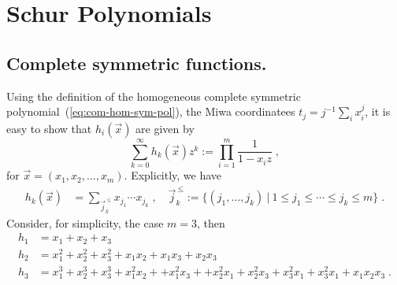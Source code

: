 \section{Schur Polynomials}


\subsection{Complete symmetric functions.} 

Using the definition of the homogeneous complete symmetric
polynomial~(\ref{eq:com-hom-sym-pol}), the Miwa coordinatees \(t_j =
j^{-1}\sum_i x_i^j\), it is easy to show that \(h_i(\vec{x})\) are
given by
\begin{equation}
\sum_{k=0}^\infty h_k(\vec{x}) z^k := \prod_{i=1}^m\frac{1}{1-x_i z}\; ,
\end{equation} 
for \(\vec{x}=(x_1, x_2, \dots, x_m)\). Explicitly, we have~\cite{Prasad2018}
\begin{equation}
\begin{split}
    h_k(\vec{x}) & = \sum_{\vec{j}_k^{\ \leq}} x_{j_1}\cdots x_{j_k}\; , \quad 
    \vec{j}_k^{\ \leq}:=\{ (j_1, \dots, j_k)\ |\ 1 \leq j_1\leq \cdots \leq j_k\leq m \}\; .
\end{split}
\end{equation}
Consider, for simplicity, the case \(m=3\), then
\begin{subequations} 
\begin{equation}
\begin{split} 
    h_1&  = x_1 + x_2 + x_3\\
    h_2&  = x^2_1 + x^2_2 + x^2_3+x_1 x_2 + x_1 x_3 + x_2 x_3\\
    h_3&  = x^3_1 + x^3_2 + x^3_3+x_1^2 x_2 + +x_1^2 x_3 + +x_2^2 x_1 + x_2^2 x_3 
    +x_3^2 x_1 +x_3^2 x_1 + x_1 x_2 x_3\; .
\end{split}			
\end{equation}
\end{subequations} 

